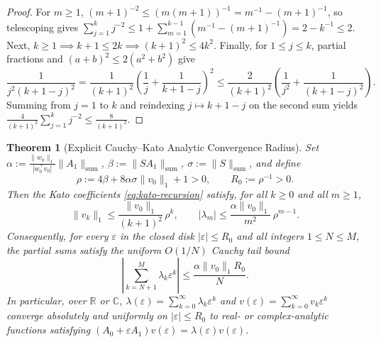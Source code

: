 \documentclass[11pt,a4paper]{article}
\newtheorem{theorem}{Theorem}[section]
\theoremstyle{definition}
\begin{document}
\begin{proof}
For $m \ge 1$, $(m + 1)^{-2} \le (m(m + 1))^{-1} = m^{-1} - (m + 1)^{-1}$, so
telescoping gives $\sum_{j=1}^k j^{-2} \le 1 + \sum_{m=1}^{k-1}(m^{-1} - (m+1)^{-1}) =
2 - k^{-1} \le 2$. Next, $k \ge 1 \implies k + 1 \le 2k \implies (k + 1)^2 \le 4k^2$.
Finally, for $1 \le j \le k$, partial fractions and $(a + b)^2 \le 2(a^2 + b^2)$ give
\[
  \frac{1}{j^2 (k + 1 - j)^2}
  = \frac{1}{(k + 1)^2}\left(\frac{1}{j} + \frac{1}{k + 1 - j}\right)^2
  \le \frac{2}{(k + 1)^2}\left(\frac{1}{j^2} + \frac{1}{(k + 1 - j)^2}\right).
\]
Summing from $j = 1$ to $k$ and reindexing $j \mapsto k + 1 - j$ on the second sum
yields $\frac{4}{(k + 1)^2} \sum_{j=1}^k j^{-2} \le \frac{8}{(k + 1)^2}$.
\end{proof}

\begin{theorem}[Explicit Cauchy--Kato Analytic Convergence Radius]\label{thm:majorant}
Set $\alpha := \frac{\|w_0\|_1}{|w_0^\top v_0|}\|A_1\|_{\mathrm{sum}}$,
$\beta := \|S A_1\|_{\mathrm{sum}}$, $\sigma := \|S\|_{\mathrm{sum}}$, and define
\[
  \rho := 4\beta + 8\alpha\sigma\|v_0\|_1 + 1 > 0, \qquad
  R_0 := \rho^{-1} > 0.
\]
Then the Kato coefficients \eqref{eq:kato-recursion} satisfy, for all $k \ge 0$ and all
$m \ge 1$,
\begin{equation}\label{eq:majorant}
  \|v_k\|_1 \le \frac{\|v_0\|_1}{(k + 1)^2}\,\rho^k, \qquad
  |\lambda_m| \le \frac{\alpha\|v_0\|_1}{m^2}\,\rho^{m-1}.
\end{equation}
Consequently, for every $\varepsilon$ in the closed disk $|\varepsilon| \le R_0$ and all
integers $1 \le N \le M$, the partial sums satisfy the uniform $O(1/N)$ Cauchy tail bound
\begin{equation}\label{eq:cauchy-tail}
  \left|\sum_{k=N+1}^M \lambda_k \varepsilon^k\right|
  \le \frac{\alpha \|v_0\|_1 R_0}{N}.
\end{equation}
In particular, over $\mathbb{R}$ or $\mathbb{C}$, $\lambda(\varepsilon) =
\sum_{k=0}^\infty \lambda_k \varepsilon^k$ and $v(\varepsilon) = \sum_{k=0}^\infty v_k
\varepsilon^k$ converge absolutely and uniformly on $|\varepsilon| \le R_0$ to real- or
complex-analytic functions satisfying $(A_0 + \varepsilon A_1)v(\varepsilon) =
\lambda(\varepsilon)v(\varepsilon)$.
\end{theorem}
\end{document}
